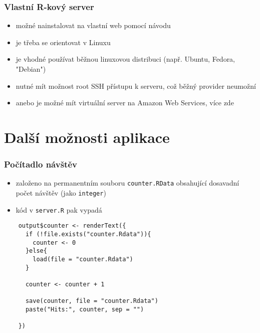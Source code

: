 \documentclass[t]{beamer}
\begin{document}

\begin{frame}
  \frametitle{Vlastní \textsf{R}-kový server}
  \begin{itemize}
    \item možné nainstalovat na vlastní web pomocí návodu
  \end{itemize}
  \begin{center}
    \href{https://www.rstudio.com/products/rstudio/download-server/}{%
    }
  \end{center}
  \begin{itemize}
    \item je třeba se orientovat v Linuxu
    \item je vhodné používat běžnou linuxovou distribuci
    (např. Ubuntu, Fedora, "Debian")
    \item nutné mít možnost root SSH přístupu k serveru,
    což běžný provider neumožní
    \item anebo je možné mít virtuální server na Amazon Web Services,
    více zde
  \end{itemize}
  \begin{center}
    \href{https://aws.amazon.com/blogs/big-data/running-r-on-aws/}{%
    }
  \end{center}
\end{frame}



\section{Další možnosti aplikace}



\begin{frame}[fragile]
  \frametitle{Počítadlo návštěv}
  \begin{itemize}
    \item založeno na permanentním souboru \texttt{counter.RData}
    obsahující dosavadní počet návštěv (jako \texttt{integer})
    \item kód v \texttt{server.R} pak vypadá
  \end{itemize}
  \begin{lstlisting}
    output$counter <- renderText({
      if (!file.exists("counter.Rdata")){
        counter <- 0
      }else{
        load(file = "counter.Rdata")
      }
    
      counter <- counter + 1
  
      save(counter, file = "counter.Rdata")
      paste("Hits:", counter, sep = "")
  
    })
  \end{lstlisting}
\end{frame}
\end{document}
